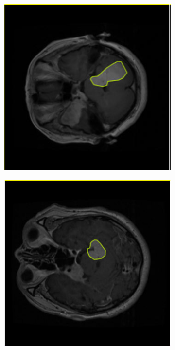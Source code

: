 \documentclass[a4paper,12pt]{extarticle}
\begin{document}
\begin{figure}[H]
   
    \centering
    \begin{subfigure}[b]{0.2\textwidth}
        \centering
        \includegraphics[width=\textwidth]{figure/1.png}
    \end{subfigure}
    \begin{subfigure}[b]{0.2\textwidth}
        \centering
        \includegraphics[width=\textwidth]{figure/2.png}

\end{subfigure}
\end{figure}
\end{document}
